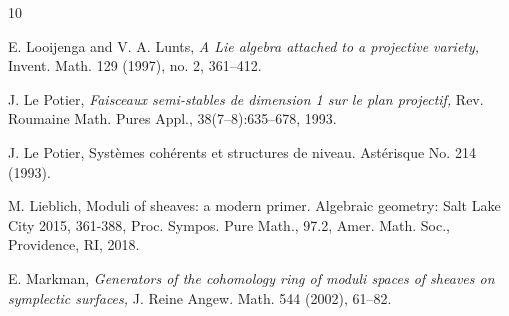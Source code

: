 \documentclass[11pt]{amsart}
\theoremstyle{plain}
\theoremstyle{definition}
\theoremstyle{remark}
\begin{document}
\begin{thebibliography}{10}








 E. Looijenga and V. A. Lunts, {\em A Lie algebra attached to a projective variety,} Invent. Math. 129 (1997), no. 2, 361--412. 

 J. Le Potier, {\em Faisceaux semi-stables de dimension 1 sur le plan projectif,} Rev. Roumaine Math. Pures Appl., 38(7--8):635--678, 1993.

 J. Le Potier, Syst\`emes coh\'erents et structures de niveau. Ast\'erisque No. 214 (1993).

 M. Lieblich, Moduli of sheaves: a modern primer. Algebraic geometry: Salt Lake City 2015, 361-388, Proc. Sympos. Pure Math., 97.2, Amer. Math. Soc., Providence, RI, 2018. 


 E. Markman, {\em Generators of the cohomology ring of moduli spaces of sheaves on symplectic surfaces,} J. Reine Angew. Math. 544 (2002), 61--82. 



\end{thebibliography}
\end{document}

